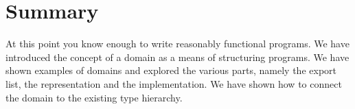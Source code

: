 %
%
%
%
%
%
%
%
%
\section{Summary}

At this point you know enough to write reasonably functional \asharp{}
programs. We have introduced the concept of a domain as a means of
structuring \asharp{} programs. We have shown examples of domains and
explored the various parts, namely the export list, the representation
and the implementation. We have shown how to connect the domain to the
existing type hierarchy.

